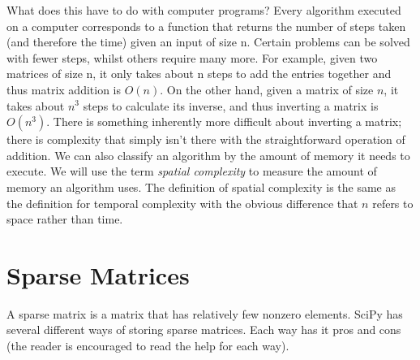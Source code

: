 What does this have to do with computer programs?  
Every algorithm executed on a computer corresponds to a function 
that returns the number of steps taken (and therefore the time) 
given an input of size n.  Certain problems can be solved with fewer steps,
whilst others require many more.  For example, given two matrices of size n,
it only takes about n steps to add the entries together and thus matrix addition is $O(n)$.  
On the other hand, given a matrix of size $n$, it takes about 
$n^3$ steps to calculate its inverse, 
and thus inverting a matrix is $O(n^3)$.
There is something inherently more difficult about inverting a matrix; 
there is complexity that simply isn't there with the straightforward operation of addition.
We can also classify an algorithm by the amount of memory it needs to execute.  We will use the term \emph{spatial complexity} to measure the amount of memory an algorithm uses.  The definition of spatial complexity is the same as the definition for temporal complexity with the obvious difference that $n$ refers to space rather than time.

\section*{Sparse Matrices}
A sparse matrix is a matrix that has relatively few nonzero elements.
SciPy has several different ways of storing sparse matrices.  
Each way has it pros and cons (the reader is encouraged to read the help for each way).

